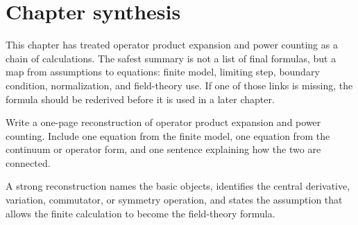 \section{Chapter synthesis}

This chapter has treated operator product expansion and power counting as a chain of calculations.  The safest summary is not a list of final formulas, but a map from assumptions to equations: finite model, limiting step, boundary condition, normalization, and field-theory use.  If one of those links is missing, the formula should be rederived before it is used in a later chapter.

\begin{exercise}
Write a one-page reconstruction of operator product expansion and power counting.  Include one equation from the finite model, one equation from the continuum or operator form, and one sentence explaining how the two are connected.
\begin{answer}
A strong reconstruction names the basic objects, identifies the central derivative, variation, commutator, or symmetry operation, and states the assumption that allows the finite calculation to become the field-theory formula.
\end{answer}
\end{exercise}
